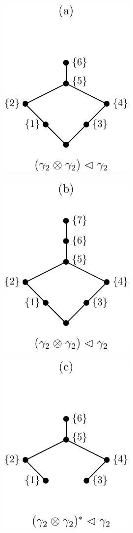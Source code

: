 \documentclass[12pt]{article}
\theoremstyle{definition}
\theoremstyle{remark}
\begin{document}
\begin{center}
\begin{minipage}[c]{0.2\textwidth}
\centering
\includegraphics[scale=0.7]{fri_aa.pdf}
\end{minipage}
\begin{minipage}[c]{0.2\textwidth}
\centering
\includegraphics[scale=0.7]{fri_b.pdf}
\end{minipage}
\begin{minipage}[c]{0.2\textwidth}
\centering
\includegraphics[scale=0.7]{fri_c.pdf}

\end{minipage}
\end{center}
\end{document}
